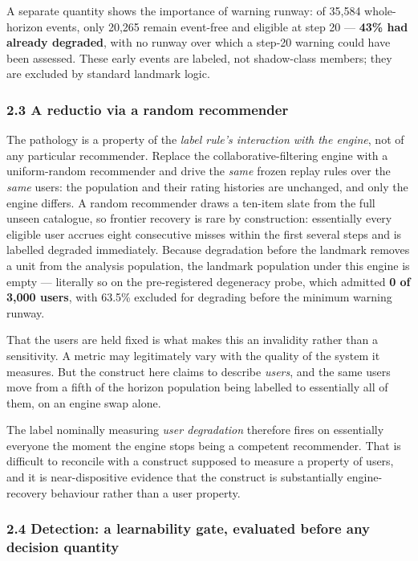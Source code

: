 \documentclass[
  11pt,
]{article}
\begin{document}
A separate quantity shows the importance of warning runway: of 35,584
whole-horizon events, only 20,265 remain event-free and eligible at step
20 --- \textbf{43\% had already degraded}, with no runway over which a
step-20 warning could have been assessed. These early events are
labeled, not shadow-class members; they are excluded by standard
landmark logic.

\subsubsection{2.3 A reductio via a random
recommender}\label{a-reductio-via-a-random-recommender}

The pathology is a property of the \emph{label rule's interaction with
the engine}, not of any particular recommender. Replace the
collaborative-filtering engine with a uniform-random recommender and
drive the \emph{same} frozen replay rules over the \emph{same} users:
the population and their rating histories are unchanged, and only the
engine differs. A random recommender draws a ten-item slate from the
full unseen catalogue, so frontier recovery is rare by construction:
essentially every eligible user accrues eight consecutive misses within
the first several steps and is labelled degraded immediately. Because
degradation before the landmark removes a unit from the analysis
population, the landmark population under this engine is empty ---
literally so on the pre-registered degeneracy probe, which admitted
\textbf{0 of 3,000 users}, with 63.5\% excluded for degrading before the
minimum warning runway.

That the users are held fixed is what makes this an invalidity rather
than a sensitivity. A metric may legitimately vary with the quality of
the system it measures. But the construct here claims to describe
\emph{users}, and the same users move from a fifth of the horizon
population being labelled to essentially all of them, on an engine swap
alone.

The label nominally measuring \emph{user degradation} therefore fires on
essentially everyone the moment the engine stops being a competent
recommender. That is difficult to reconcile with a construct supposed to
measure a property of users, and it is near-dispositive evidence that
the construct is substantially engine-recovery behaviour rather than a
user property.

\subsubsection{2.4 Detection: a learnability gate, evaluated before any
decision
quantity}\label{detection-a-learnability-gate-evaluated-before-any-decision-quantity}
\end{document}
